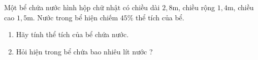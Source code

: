 \begin{ex}%
	Một bể chứa nước hình hộp chữ nhật có chiều dài $2{,}8$m, chiều rộng $1{,}4$m, chiều cao $1{,}5$m. Nước trong bể hiện chiếm $45\% $ thể tích của bể.
	\begin{enumerate}
		\item Hãy tính thể tích của bể chứa nước.
		\item Hỏi hiện trong bể chứa bao nhiêu lít nước ?
	\end{enumerate}
\end{ex}

